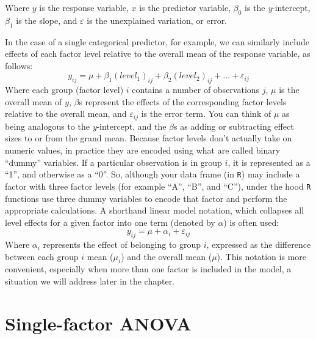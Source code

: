 \documentclass[]{book}
\begin{document}
Where \(y\) is the response variable, \(x\) is the predictor variable, \(\beta_0\) is the \emph{y}-intercept, \(\beta_1\) is the slope, and \(\varepsilon\) is the unexplained variation, or error.

In the case of a single categorical predictor, for example, we can similarly include effects of each factor level relative to the overall mean of the response variable, as follows:
\[y_{ij}=\mu+\beta_1(level_1)_{ij}+\beta_2(level_2)_{ij}+...+\varepsilon_{ij}\]
Where each group (factor level) \(i\) contains a number of observations \(j\), \(\mu\) is the overall mean of \(y\), \(\beta\)s represent the effects of the corresponding factor levels relative to the overall mean, and \(\varepsilon_{ij}\) is the error term. You can think of \(\mu\) as being analogous to the \emph{y}-intercept, and the \(\beta\)s as adding or subtracting effect sizes to or from the grand mean. Because factor levels don't actually take on numeric values, in practice they are encoded using what are called binary ``dummy'' variables. If a particular observation is in group \(i\), it is represented as a ``1'', and otherwise as a ``0''. So, although your data frame (in \texttt{R}) may include a factor with three factor levels (for example ``A'', ``B'', and ``C''), under the hood \texttt{R} functions use three dummy variables to encode that factor and perform the appropriate calculations. A shorthand linear model notation, which collapses all level effects for a given factor into one term (denoted by \(\alpha\)) is often used:
\[y_{ij}=\mu+\alpha_i+\varepsilon_{ij}\]
Where \(\alpha_i\) represents the effect of belonging to group \(i\), expressed as the difference between each group \(i\) mean (\(\mu_i\)) and the overall mean (\(\mu\)). This notation is more convenient, especially when more than one factor is included in the model, a situation we will address later in the chapter.

\hypertarget{single-factor-anova}{%
\section{Single-factor ANOVA}\label{single-factor-anova}}
\end{document}
